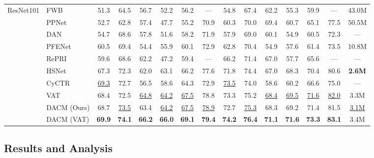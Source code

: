 \documentclass[runningheads]{llncs}
\begin{document}
\begin{table}[tbp]
{\begin{tabular}{clccccccccccccc}
 
\multirow{10}{*}{ResNet101 \cite{he2016deep}} & FWB \cite{nguyen2019feature}& 51.3 & 64.5 & 56.7 & 52.2 & 56.2 & --- & 54.8 & 67.4 & 62.2 & 55.3 & 59.9 & --- & 43.0M \\
 & PPNet \cite{liu2020part}& 52.7 & 62.8 & 57.4 & 47.7 & 55.2 & 70.9 & 60.3 & 70.0 & 69.4 & 60.7 & 65.1 & 77.5 & 50.5M \\
 & DAN \cite{wang2020few}& 54.7 & 68.6 & 57.8 & 51.6 & 58.2 & 71.9 & 57.9 & 69.0 & 60.1 & 54.9 & 60.5 & 72.3 & --- \\
 & PFENet \cite{tian2020prior}& 60.5 & 69.4 & 54.4 & 55.9 & 60.1 & 72.9 & 62.8 & 70.4 & 54.9 & 57.6 & 61.4 & 73.5 & 10.8M \\
 & RePRI \cite{boudiaf2021few}& 59.6 & 68.6 & 62.2 & 47.2 & 59.4 & --- & 66.2 & 71.4 & 67.0 & 57.7 & 65.6 & --- & --- \\ 
 &HSNet \cite{min2021hypercorrelation} & 67.3 & 72.3 & 62.0 & 63.1 & 66.2 & 77.6 & 71.8 & 74.4 & 67.0 & 68.3 & 70.4 & 80.6 & \textbf{2.6M}\\
  &CyCTR \cite{zhang2021few} &\underline{69.3} &72.7 &56.5 &58.6 &64.3 &72.9 &\underline{73.5} &74.0 &58.6 &60.2 &66.6 &75.0 &--- \\
  &VAT \cite{hong2021cost} &68.4 &72.5 &\underline{64.8} &\underline{64.2} &\underline{67.5} &78.8 &73.3 &75.2 &\underline{68.4} &\underline{69.5} &\underline{71.6} &\underline{82.0} & 3.3M \\\cline{2-15}
& DACM (Ours) &68.7 & \underline{73.5} & 63.4 & \underline{64.2}  & \underline{67.5} & \underline{78.9} & 72.7 & \underline{75.3} & 68.3 & 69.2 & 71.4 & 81.5 & \underline{3.1M} \\
& DACM (VAT)  &\textbf{69.9} & \textbf{74.1} & \textbf{66.2} & \textbf{66.0}  & \textbf{69.1} & \textbf{79.4} & \textbf{74.2} & \textbf{76.4} & \textbf{71.1} & \textbf{71.6} & \textbf{73.3} & \textbf{83.1} & 3.4M \\\cline{2-15} \hline
\end{tabular}}
\end{table}
\subsection{Results and Analysis}
\end{document}
